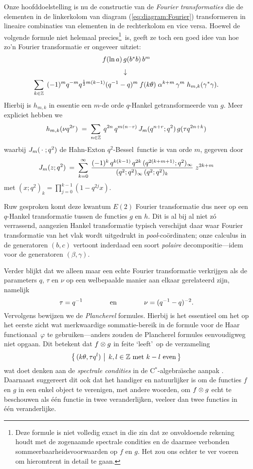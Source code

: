 \documentclass{book}
\begin{document}
Onze hoofddoelstelling is nu de constructie van de {\em Fourier transformaties\/}
die de elementen in de linkerkolom van diagram (\ref{eq:diagram:Fourier}) transformeren
in lineaire combinaties van elementen in de rechterkolom en vice versa. Hoewel de volgende formule niet helemaal
precies\footnote{Deze formule is niet volledig exact in die zin dat ze onvoldoende
rekening houdt met de zogenaamde spectrale condities en de daarmee
verbonden sommeerbaarheids\-voor\-waarden op $f$ en $g$.
Het zou ons echter te ver voeren om hieromtrent in detail te gaan.}\
is, geeft ze toch een goed idee van hoe zo'n Fourier transformatie er ongeveer uitziet:
$$ \begin{array}{c}
    f(\ln a)\, g(b^* b)\, b^m
\\
\downarrow\vertXL
\\  \displaystyle
    \sum_{k\in\ZZ} \:\: (-1)^m q^{-m} q^{\frac{1}{2}m(k-1)} (q^{-1}-q)^m \:
       f(k \theta) \;  \alpha^{k+m} \, \gamma^m \;  h_{m,k}(\gamma^*\gamma).\vertXL
\end{array}$$
Hierbij is $h_{m,k}$ in essentie een $m$-de orde $q$-Hankel getransformeerde van $g$.
Meer expliciet hebben we
$$ h_{m,k}(\nu q^{2r})
       \;=\; \sum_{n\in\ZZ} \: q^{2n} \, q^{m(n-r)}\, \J{m}{q^{n+r}} \, g(\tau q^{2n+k}) $$
waarbij $\J{m}{\,\cdot\;}$ de Hahn-Exton \mbox{$q^2$-Bessel}\ functie is van orde $m$,
gegeven door
$$ \J{m}{z} \:=\; \sum_{k=0}^{\infty} \:  \frac{(-1)^k\,q^{k(k-1)}\,
     q^{2k}\,(q^{2(k+m+1)}; q^2)_\infty}{(q^2;q^2)_\infty  \,(q^2;q^2)_k} \; z^{2k+m} $$
met $(x;q^2)_k = \prod_{j=0}^{k-1} (1-q^{2j} x)$.

Ruw gesproken komt deze kwantum $E(2)$ Fourier transformatie dus neer op
een $q$-Hankel transformatie tussen de functies $g$ en $h$.
Dit is al bij al niet z\'o verrassend, aangezien Hankel transformatie typisch verschijnt
daar waar Fourier transformatie van het vlak wordt uitgedrukt in {\em pool\/}-co\"ordinaten;
onze calculus in de generatoren $(b,c)$ vertoont inderdaad een soort {\em polaire\/}
decompositie---idem voor de generatoren $(\beta,\gamma)$.


Verder blijkt dat we alleen maar een echte Fourier transformatie verkrijgen
als de parameters $q$, $\tau$ en $\nu$ op een welbepaalde manier
aan elkaar gerelateerd zijn, namelijk
$$   \tau = q^{-1}   \andspace{4em}   \nu = (q^{-1}-q)^{-2}. $$
Vervolgens bewijzen we de {\em Plancherel\/} formules.
Hierbij is het essentieel om het op het eerste zicht wat merkwaardige
sommatie-bereik in de formule voor de Haar \mbox{functionaal $\varphi$} te
gebruiken---anders zouden de Plancherel formules eenvoudigweg niet opgaan.
Dit betekent dat $f\tens g$ in feite \lq leeft\rq\ op de verzameling
$$ \left\{ \, (k \theta, \tau q^l)   \, \left|\vertM\right. \,
            k,l\in \ZZ \mbox{ met } k-l \mbox{ even} \, \right\}  $$
wat doet denken aan de {\em spectrale condities\/} in de \mbox{C$^*$}-algebra\"{\i}sche
aanpak \cite{Wor:QE2}\@. Daarnaast suggereert dit ook dat het handiger en
natuurlijker is om de functies $f$ en $g$ in een enkel object te verenigen,
met andere woorden, om $f\tens g$ echt te beschouwen als \'e\'en functie in twee veranderlijken,
veeleer dan twee functies in \'e\'en veranderlijke.
\end{document}
